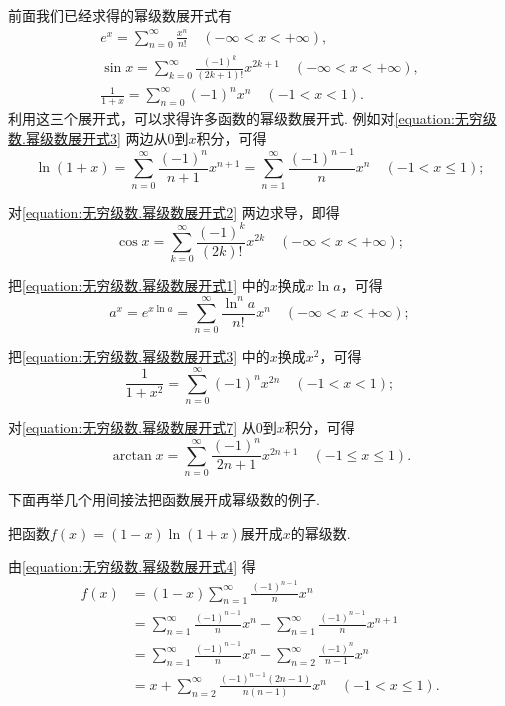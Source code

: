 前面我们已经求得的幂级数展开式有\begin{gather}
	e^x = \sum_{n=0}^\infty \frac{x^n}{n!}
		\quad(-\infty<x<+\infty), \label{equation:无穷级数.幂级数展开式1} \\
	\sin x = \sum_{k=0}^\infty \frac{(-1)^k}{(2k+1)!} x^{2k+1}
		\quad(-\infty<x<+\infty), \label{equation:无穷级数.幂级数展开式2} \\
	\frac{1}{1+x} = \sum_{n=0}^\infty (-1)^n x^n
		\quad(-1<x<1). \label{equation:无穷级数.幂级数展开式3}
\end{gather}
利用这三个展开式，可以求得许多函数的幂级数展开式.
例如对\cref{equation:无穷级数.幂级数展开式3} 两边从\(0\)到\(x\)积分，可得
\begin{equation}\label{equation:无穷级数.幂级数展开式4}
	\ln(1+x) = \sum_{n=0}^\infty \frac{(-1)^n}{n+1} x^{n+1}
	= \sum_{n=1}^\infty \frac{(-1)^{n-1}}{n} x^n
	\quad(-1<x\leq1);
\end{equation}

对\cref{equation:无穷级数.幂级数展开式2} 两边求导，即得
\begin{equation}\label{equation:无穷级数.幂级数展开式5}
	\cos x = \sum_{k=0}^\infty \frac{(-1)^k}{(2k)!} x^{2k}
	\quad(-\infty<x<+\infty);
\end{equation}

把\cref{equation:无穷级数.幂级数展开式1} 中的\(x\)换成\(x \ln a\)，可得
\begin{equation}\label{equation:无穷级数.幂级数展开式6}
	a^x = e^{x \ln a} = \sum_{n=0}^\infty \frac{\ln^n a}{n!} x^n
	\quad(-\infty<x<+\infty);
\end{equation}

把\cref{equation:无穷级数.幂级数展开式3} 中的\(x\)换成\(x^2\)，可得
\begin{equation}\label{equation:无穷级数.幂级数展开式7}
	\frac{1}{1+x^2} = \sum_{n=0}^\infty (-1)^n x^{2n}
	\quad(-1<x<1);
\end{equation}

对\cref{equation:无穷级数.幂级数展开式7} 从\(0\)到\(x\)积分，可得
\begin{equation}
	\arctan x = \sum_{n=0}^\infty \frac{(-1)^n}{2n+1} x^{2n+1}
	\quad(-1 \leq x \leq 1).
\end{equation}

下面再举几个用间接法把函数展开成幂级数的例子.

\begin{example}
把函数\(f(x) = (1-x) \ln(1+x)\)展开成\(x\)的幂级数.
\begin{solution}
由\cref{equation:无穷级数.幂级数展开式4}
得\begin{align*}
	f(x) &= (1-x) \sum_{n=1}^\infty \frac{(-1)^{n-1}}{n} x^n \\
	&= \sum_{n=1}^\infty \frac{(-1)^{n-1}}{n} x^n
		- \sum_{n=1}^\infty \frac{(-1)^{n-1}}{n} x^{n+1} \\
	&= \sum_{n=1}^\infty \frac{(-1)^{n-1}}{n} x^n
		- \sum_{n=2}^\infty \frac{(-1)^n}{n-1} x^n \\
	&= x + \sum_{n=2}^\infty \frac{(-1)^{n-1} (2n-1)}{n(n-1)} x^n
	\quad(-1 < x \leq 1).
\end{align*}
\end{solution}
\end{example}

